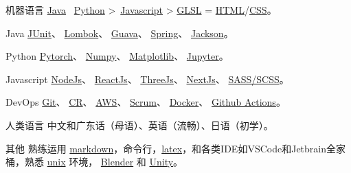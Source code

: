
\begin{cvskills}

  \cvskill
    {机器语言}
    {\href{https://www.java.com/en/}{Java} \approx \, \href{https://www.python.org/}{Python} >\, \href{https://www.javascript.com/}{Javascript} > \href{https://www.khronos.org/opengl/wiki/OpenGL_Shading_Language}{GLSL} = \href{https://developer.mozilla.org/en-US/docs/Glossary/HTML5}{HTML}/\href{https://developer.mozilla.org/en-US/docs/Web/CSS}{CSS}。}
  
  \cvskill
    {Java} %
    {\href{https://junit.org/junit4/}{JUnit}、 \href{https://projectlombok.org/}{Lombok}、 \href{https://github.com/google/guava}{Guava}、 \href{https://spring.io/}{Spring}、 \href{https://github.com/FasterXML/jackson}{Jackson}。}  %

  \cvskill
    {Python} %
    {\href{https://pytorch.org/}{Pytorch}、 \href{https://numpy.org/}{Numpy}、 \href{https://matplotlib.org/}{Matplotlib}、 \href{https://jupyter.org/}{Jupyter}。}  %

  \cvskill
    {Javascript} %
    {\href{https://nodejs.org/en/}{NodeJs}、 \href{https://reactjs.org/}{ReactJs}、 \href{https://threejs.org/}{ThreeJs}、 \href{https://nextjs.org/}{NextJs}、 \href{https://sass-lang.com/}{SASS/SCSS}。}
  
  \cvskill
    {DevOps} %
    {\href{https://git-scm.com/}{Git}、 \href{https://en.wikipedia.org/wiki/Code_review}{CR}、 \href{https://aws.amazon.com/}{AWS}、 \href{https://www.scrum.org/resources/what-is-scrum}{Scrum}、 \href{https://www.docker.com/}{Docker}、 \href{https://github.com/features/actions}{Github Actions}。}
 
  \cvskill
    {人类语言}
    {中文和广东话（母语）、英语（流畅）、日语（初学）。}

  \cvskill
    {其他} %
    {熟练运用 \href{https://en.wikipedia.org/wiki/Markdown}{markdown}，命令行，\href{https://www.latex-project.org/}{latex}，和各类IDE如VSCode和Jetbrain全家桶，熟悉 \href{https://en.wikipedia.org/wiki/Unix}{unix} 环境， \href{https://www.blender.org/}{Blender} 和 \href{https://unity.com/}{Unity}。}

\end{cvskills}
